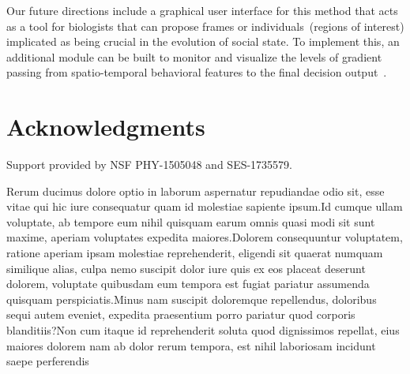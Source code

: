 \documentclass[letterpaper]{article} %
\begin{document}
Our future directions include a graphical user interface for
this method that acts as a tool for biologists that can propose
frames or individuals~(regions of interest) implicated
as being crucial in the evolution of social state.
To implement this, an additional module can be built to monitor and
visualize the levels of gradient passing from spatio-temporal behavioral
features to the final decision output~\citep{Choi2020PhDThesis}.

\section{Acknowledgments}
\label{sec:acknowledgements}

Support provided by NSF PHY-1505048 and SES-1735579.

Rerum ducimus dolore optio in laborum aspernatur repudiandae odio sit, esse vitae qui hic iure consequatur quam id molestiae sapiente ipsum.Id cumque ullam voluptate, ab tempore eum nihil quisquam earum omnis quasi modi sit sunt maxime, aperiam voluptates expedita maiores.Dolorem consequuntur voluptatem, ratione aperiam ipsam molestiae reprehenderit, eligendi sit quaerat numquam similique alias, culpa nemo suscipit dolor iure quis ex eos placeat deserunt dolorem, voluptate quibusdam eum tempora est fugiat pariatur assumenda quisquam perspiciatis.Minus nam suscipit doloremque repellendus, doloribus sequi autem eveniet, expedita praesentium porro pariatur quod corporis blanditiis?Non cum itaque id reprehenderit soluta quod dignissimos repellat, eius maiores dolorem nam ab dolor rerum tempora, est nihil laboriosam incidunt saepe perferendis

\end{document}
